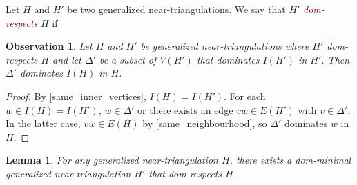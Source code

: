 \documentclass{article}
\newtheorem{obs}{Observation}
\newtheorem{lem}{Lemma}
\newcommand{\defin}[1]{\emph{\textcolor{Maroon}{#1}}}
\theoremstyle{definition}
\begin{document}
Let $H$ and $H'$ be two generalized near-triangulations.  We say that $H'$ \defin{dom-respects} $H$ if

\begin{obs}
  Let $H$ and $H'$ be generalized near-triangulations where $H'$ dom-respects $H$ and let $\Delta'$ be a subset of $V(H')$ that dominates $I(H')$ in $H'$.  Then $\Delta'$ dominates $I(H)$ in $H$.
\end{obs}

\begin{proof}
  By \cref{same_inner_vertices}, $I(H)=I(H')$. For each $w\in I(H)=I(H')$, $w\in \Delta'$ or there exists an edge $vw\in E(H')$ with $v\in\Delta'$.  In the latter case, $vw\in E(H)$ by \cref{same_neighbourhood}, so $\Delta'$ dominates $w$ in $H$.
\end{proof}

\begin{lem}\label{dom_minimal}
  For any generalized near-triangulation $H$, there exists a dom-minimal generalized near-triangulation $H'$ that dom-respects $H$.
\end{lem}
\end{document}

